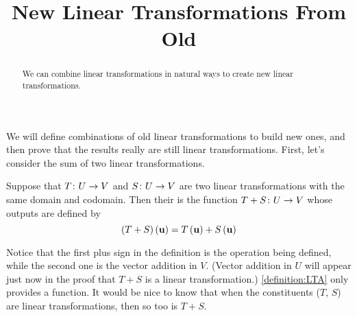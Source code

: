 \documentclass{ximera}
\title{New Linear Transformations From Old}
\begin{document}
\begin{abstract}
We can combine linear transformations in natural ways to create new linear transformations.  
\end{abstract}
\maketitle

We will define combinations of old linear transformations to build new
ones, and then prove that the results really are still linear
transformations.  First, let's consider the sum of two linear transformations.

\begin{definition}

  Suppose that $T\colon U\rightarrow V$ and $S\colon U\rightarrow V$ are two
  linear transformations with the same domain and codomain.  Then
  their  is the function $T+S\colon U\rightarrow V$ whose outputs
  are defined by
  \[
    (T+S)\left(\mathbf{u}\right)=T\left(\mathbf{u}\right)+S\left(\mathbf{u}\right)
  \]

\end{definition}

Notice that the first plus sign in the definition is the operation
being defined, while the second one is the vector addition in $V$.
(Vector addition in $U$ will appear just now in the proof that $T+S$
is a linear transformation.)  \ref{definition:LTA} only provides a
function.  It would be nice to know that when the constituents ($T$,
$S$) are linear transformations, then so too is $T+S$.
\end{document}
